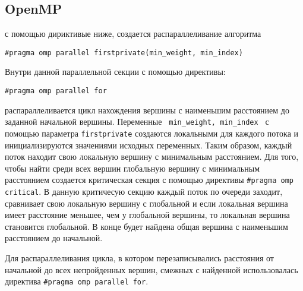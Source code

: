 \documentclass{report}
\begin{document}
\subsection*{OpenMP}
с помощью дириктивые ниже, создается распараллеливание алгоритма
\par \verb|#pragma omp parallel firstprivate(min_weight, min_index)| 
\par Внутри данной параллельной секции с помощью директивы: 
\par\verb|#pragma omp parallel for | 
\par распараллеливается цикл нахождения вершины с наименьшим расстоянием до заданной начальной вершины. Переменные \verb| min_weight, min_index | с помощью параметра \verb|firstprivate| создаются локальными для каждого потока и инициализируются значениями исходных переменных. Таким образом, каждый поток находит свою локальную вершину с минимальным расстоянием. Для того, чтобы найти среди всех вершин глобальную вершину с минимальным расстоянием создается критическая секция с помощью директивы \verb|#pragma omp critical|. В данную критичесую секцию каждый поток по очереди заходит, сравнивает свою локальную вершину с глобальной и если локальная вершина имеет расстояние меньшее, чем у глобальной вершины, то локальная вершина становится глобальной. В конце будет найдена общая вершина с наименьшим расстоянием до начальной.
\par Для распараллеливания цикла, в котором перезаписывались расстояния от начальной до всех непройденных вершин, смежных с найденной использовалась директива \verb|#pragma omp parallel for|.
\end{document}
